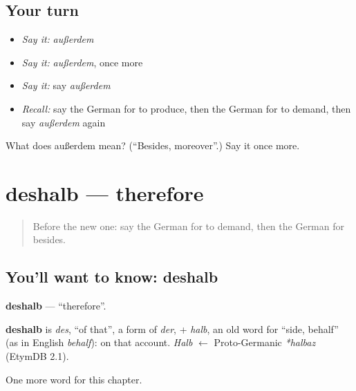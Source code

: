 \subsection*{Your turn}
\begin{itemize}
\raggedright
  \item \emph{Say it:} \emph{außerdem}
  \item \emph{Say it:} \emph{außerdem}, once more
  \item \emph{Say it:} say \emph{außerdem}
  \item \emph{Recall:} say the German for to produce, then the German for to demand, then say \emph{außerdem} again
\end{itemize}

\begin{tcolorbox}[breakable,colback=teal!4,colframe=teal!35!black,title={Before you move on}]
What does außerdem mean? (\textquotedblleft{}Besides, moreover\textquotedblright{}.) Say it once more.
\end{tcolorbox}
\section[deshalb]{deshalb — therefore}

\label{lesson:GE-C250-deshalb}



\begin{quote}
Before the new one: say the German for to demand, then the German for besides.
\end{quote}

\subsection*{You'll want to know: deshalb}
\textbf{deshalb} — \textquotedblleft{}therefore\textquotedblright{}.

\begin{cousinweb}
\textbf{deshalb} is \emph{des}, \textquotedblleft{}of that\textquotedblright{}, a form of \emph{der}, + \emph{halb}, an old word for \textquotedblleft{}side, behalf\textquotedblright{} (as in English \emph{behalf}): on that account. \emph{Halb} $\leftarrow$ Proto-Germanic \emph{*halbaz} (EtymDB 2.1).
\end{cousinweb}

\begin{grammarlens}[title={What you've built}]
One more word for this chapter.
\end{grammarlens}

